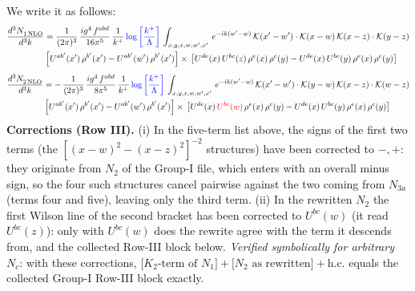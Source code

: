 \documentclass[9pt]{article}
\numberwithin{equation}{section}
\begin{document}
We write it as follows: 
\begin{align}
   \frac{d^{3}N_{1\,\rm NLO}^{\rm}}{d^{3}k}  & = \frac{1}{(2\pi)^{3}}\,\frac{ig^{4}\,f^{abd}}{16\pi^{5}}\,\frac{1}{k^{+}}\,{\color{blue}\log{\left[\frac{k^{+}}{\Lambda}\right]}}\,\int_{x,y,z,w,w',x'}\,e^{-ik(w^\prime-w)}\, \mathcal{K}(x'-w')\cdot \mathcal{K}(x-w)\, \mathcal{K}(x-z)\cdot \mathcal{K}(y-z) \notag \\ & \left[U^{ab'}(x')\,\rho^{b'}(x')-U^{ab'}(w')\, \rho^{b'}(x')\right]\times\, \left[U^{de}(x)\,U^{bc}(z)\, \rho^{e}(x)\,\rho^{c}(y)-U^{de}(x)\,U^{bc}(y)\,\rho^{e}(x)\,\rho^{c}(y)\right]
\end{align}
\begin{align}
   \frac{d^{3}N_{2\,\rm NLO}^{\rm}}{d^{3}k}  & = -\,\frac{1}{(2\pi)^{3}}\, \frac{ig^{4}\, f^{abd}}{8\pi^{5}}\, \frac{1}{k^{+}}\,{\color{blue}\log{\left[\frac{k^{+}}{\Lambda}\right]}}\,\int_{x,y,z,w,w',x'}\,e^{-ik(w^\prime-w)}\, \mathcal{K}(x'-w')\cdot \mathcal{K}(y-w)\,\mathcal{K}(x-z)\cdot \mathcal{K}(w-z) \notag \\ & \left[U^{ab'}(x')\,\rho^{b'}(x')-U^{ab'}(w')\, \rho^{b'}(x')\right]\times\,\left[U^{de}(x)\,{\color{red}U^{bc}(w)}\, \rho^{e}(x)\,\rho^{c}(y)-U^{de}(x)\,U^{bc}(y)\,\rho^{e}(x)\,\rho^{c}(y)\right] 
\end{align}
{\color{red}\noindent\textbf{Corrections (Row III).} (i) In the five-term list above, the signs of the first two terms (the $[(x-w)^{2}-(x-z)^{2}]^{-2}$ structures) have been corrected to $-,+$: they originate from $N_{2}$ of the Group-I file, which enters with an overall minus sign, so the four such structures cancel pairwise against the two coming from $N_{3a}$ (terms four and five), leaving only the third term. (ii) In the rewritten $N_{2}$ the first Wilson line of the second bracket has been corrected to $U^{bc}(w)$ (it read $U^{bc}(z)$): only with $U^{bc}(w)$ does the rewrite agree with the term it descends from, and the collected Row-III block below. \emph{Verified symbolically for arbitrary $N_c$}: with these corrections, $\big[K_2\text{-term of }N_1\big]+\big[N_2\text{ as rewritten}\big]+\mathrm{h.c.}$ equals the collected Group-I Row-III block exactly.}
\end{document}
